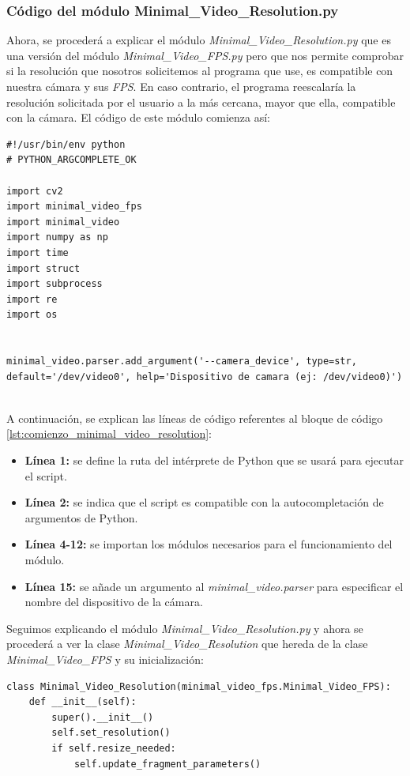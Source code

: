 \subsubsection{Código del módulo Minimal\_Video\_Resolution.py}
Ahora, se procederá a explicar el módulo \textit{Minimal\_Video\_Resolution.py} que es una versión del módulo \textit{Minimal\_Video\_FPS.py} pero que nos permite comprobar si la resolución que nosotros solicitemos al programa que use, es compatible con nuestra cámara y sus \textit{FPS}. En caso contrario, el programa reescalaría la resolución solicitada por el usuario a la más cercana, mayor que ella, compatible con la cámara. El código de este módulo comienza así:

\begin{lstlisting}[style=pythonstyle, caption={Comienzo del módulo Minimal\_Video\_Resolution.py}, label={lst:comienzo_minimal_video_resolution}]
#!/usr/bin/env python
# PYTHON_ARGCOMPLETE_OK

import cv2
import minimal_video_fps
import minimal_video
import numpy as np
import time
import struct
import subprocess
import re
import os


minimal_video.parser.add_argument('--camera_device', type=str, default='/dev/video0', help='Dispositivo de camara (ej: /dev/video0)')
   

\end{lstlisting}
\vspace{\baselineskip}

A continuación, se explican las líneas de código referentes al bloque de código \ref{lst:comienzo_minimal_video_resolution}:
\begin{itemize}
    \item \textbf{Línea 1:} se define la ruta del intérprete de Python que se usará para ejecutar el script.
    \item \textbf{Línea 2:} se indica que el script es compatible con la autocompletación de argumentos de Python.
    \item \textbf{Línea 4-12:} se importan los módulos necesarios para el funcionamiento del módulo.
    \item \textbf{Línea 15:} se añade un argumento al \textit{minimal\_video.parser} para especificar el nombre del dispositivo de la cámara.
\end{itemize}
\vspace{\baselineskip}

Seguimos explicando el módulo \textit{Minimal\_Video\_Resolution.py} y ahora se procederá a ver la clase \textit{Minimal\_Video\_Resolution} que hereda de la clase \textit{Minimal\_Video\_FPS} y su inicialización:
\begin{lstlisting}[style=pythonstyle, caption={Clase e inicialización Minimal\_Video\_Resolution}, label={lst:class_minimal_video_resolution}]
class Minimal_Video_Resolution(minimal_video_fps.Minimal_Video_FPS):
    def __init__(self):
        super().__init__()
        self.set_resolution()
        if self.resize_needed:
            self.update_fragment_parameters()
\end{lstlisting}
\vspace{\baselineskip}

